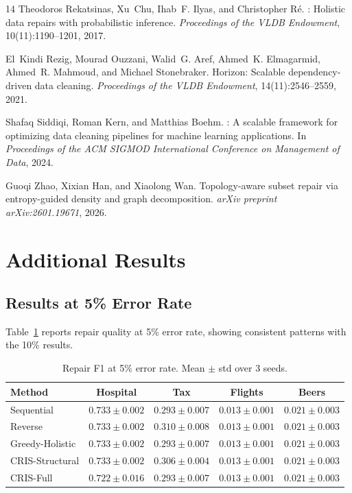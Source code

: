 \documentclass{article}
\newcommand{\cris}{\textsc{CRIS}\xspace}
\begin{document}
\begin{thebibliography}{14}
Theodoros Rekatsinas, Xu~Chu, Ihab~F. Ilyas, and Christopher R\'{e}.
: Holistic data repairs with probabilistic inference.
\newblock \emph{Proceedings of the VLDB Endowment}, 10(11):1190--1201, 2017.

El~Kindi Rezig, Mourad Ouzzani, Walid~G. Aref, Ahmed~K. Elmagarmid, Ahmed~R. Mahmoud, and Michael Stonebraker.
\newblock Horizon: Scalable dependency-driven data cleaning.
\newblock \emph{Proceedings of the VLDB Endowment}, 14(11):2546--2559, 2021.

Shafaq Siddiqi, Roman Kern, and Matthias Boehm.
: A scalable framework for optimizing data cleaning pipelines for machine learning applications.
\newblock In \emph{Proceedings of the ACM SIGMOD International Conference on Management of Data}, 2024.

Guoqi Zhao, Xixian Han, and Xiaolong Wan.
\newblock Topology-aware subset repair via entropy-guided density and graph decomposition.
\newblock \emph{arXiv preprint arXiv:2601.19671}, 2026.

\end{thebibliography}

\appendix
\section{Additional Results}
\label{app:additional}

\subsection{Results at 5\% Error Rate}

Table~\ref{tab:5pct} reports repair quality at 5\% error rate, showing consistent patterns with the 10\% results.

\begin{table}[h]
\caption{Repair F1 at 5\% error rate. Mean $\pm$ std over 3 seeds.}
\label{tab:5pct}
\centering
\small
\begin{tabular}{lcccc}
\toprule
Method & Hospital & Tax & Flights & Beers \\
\midrule
Sequential & $0.733 \pm 0.002$ & $0.293 \pm 0.007$ & $0.013 \pm 0.001$ & $0.021 \pm 0.003$ \\
Reverse & $0.733 \pm 0.002$ & $0.310 \pm 0.008$ & $0.013 \pm 0.001$ & $0.021 \pm 0.003$ \\
Greedy-Holistic & $0.733 \pm 0.002$ & $0.293 \pm 0.007$ & $0.013 \pm 0.001$ & $0.021 \pm 0.003$ \\
\cris-Structural & $0.733 \pm 0.002$ & $0.306 \pm 0.004$ & $0.013 \pm 0.001$ & $0.021 \pm 0.003$ \\
\cris-Full & $0.722 \pm 0.016$ & $0.293 \pm 0.007$ & $0.013 \pm 0.001$ & $0.021 \pm 0.003$ \\
\bottomrule
\end{tabular}
\end{table}
\end{document}
